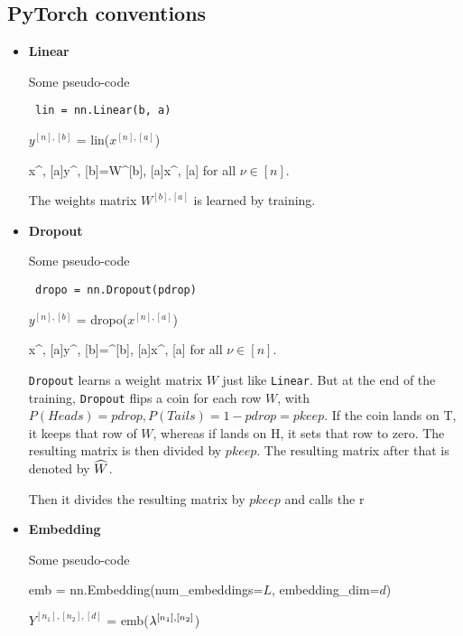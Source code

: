 \subsection{PyTorch conventions}



\begin{itemize}
\item {\bf Linear}

Some pseudo-code
\begin{mdframed}[hidealllines=true,backgroundcolor=blue!10]
{\tt
lin = nn.Linear(b, a)

$y^{[n], [b]}$ = lin($x^{[n],[a]}$)
}
\end{mdframed}

\beq
x^{\nu, [a]}\rarrow y^{\nu, [b]}=W^{[b], [a]}x^{\nu, [a]}
\eeq
for all  $\nu\in[n]$.

The weights matrix $W^{[b], [a]}$ is learned by training.

\item {\bf Dropout}

Some pseudo-code
\begin{mdframed}[hidealllines=true,backgroundcolor=blue!10]
{\tt
dropo = nn.Dropout(pdrop)

$y^{[n], [b]}$ = dropo($x^{[n],[a]}$)
}
\end{mdframed}


\beq
x^{\nu, [a]}\rarrow y^{\nu, [b]}=^{[b], [a]}x^{\nu, [a]}
\eeq
for all  $\nu\in[n]$.

{\tt Dropout} learns a weight matrix $W$ just like
{\tt Linear}. But at the end of the
training,
{\tt  Dropout} flips a coin
for each row $W$, with $P(Heads)=pdrop, P(Tails)=1-pdrop=pkeep$. If the coin lands on T, it keeps that row of $W$, whereas if lands on H,
it sets that row to zero. The
resulting matrix  is then
divided by $pkeep$.
The resulting matrix after that  is denoted by ${\widehat{W}}$.

 Then it divides the resulting
matrix by $pkeep$ and calls the r



\item {\bf Embedding}

Some pseudo-code
\begin{mdframed}[hidealllines=true,backgroundcolor=blue!10]
{\tt

emb = nn.Embedding(num\_embeddings=$L$, embedding\_dim=$d$)

$Y^{[n_1], [n_2], [d]}$ =
emb($\lambda^{[n_1], [n_2]}$)
}
\end{mdframed}


\end{itemize}
